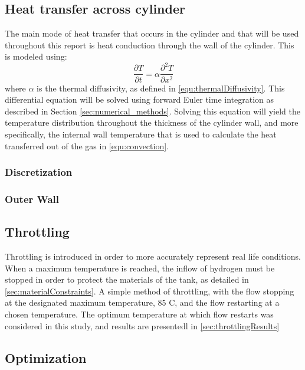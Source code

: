 \subsection{Heat transfer across cylinder}

The main mode of heat transfer that occurs in the cylinder and that will be used throughout this report is heat conduction through the wall of the cylinder. This is modeled using:
\begin{equation}
\frac{\partial T}{\partial t} = \alpha \frac{\partial^2 T }{\partial x^2}
\end{equation}
where $\alpha$ is the thermal diffusivity, as defined in \cref{equ:thermalDiffusivity}. This differential equation will be solved using forward Euler time integration as described in Section \ref{sec:numerical_methods}. Solving this equation will yield the temperature distribution throughout the thickness of the cylinder wall, and more specifically, the internal wall temperature that is used to calculate the heat transferred out of the gas in \cref{equ:convection}.


\subsubsection{Discretization}


\subsubsection{Outer Wall}




\subsection{Throttling}

Throttling is introduced in order to more accurately represent real life conditions. When a maximum temperature is reached, the inflow of hydrogen must be stopped in order to protect the materials of the tank, as detailed in \cref{sec:materialConstraints}. A simple method of throttling, with the flow stopping at the designated maximum temperature, 85 \degree C, and the flow restarting at a chosen temperature. The optimum temperature at which flow restarts was considered in this study, and results are presentedl in \cref{sec:throttlingResults}


\subsection{Optimization}

